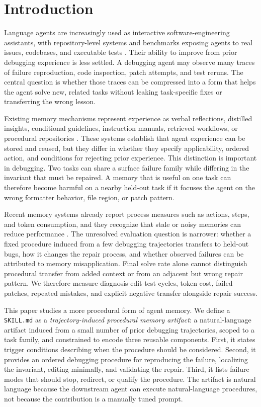 \section{Introduction}
\label{sec:introduction}

Language agents are increasingly used as interactive software-engineering assistants, with repository-level systems and benchmarks exposing agents to real issues, codebases, and executable tests \cite{jimenez2024swebench,yang2024sweagent}. Their ability to improve from prior debugging experience is less settled. A debugging agent may observe many traces of failure reproduction, code inspection, patch attempts, and test reruns. The central question is whether those traces can be compressed into a form that helps the agent solve new, related tasks without leaking task-specific fixes or transferring the wrong lesson.

Existing memory mechanisms represent experience as verbal reflections, distilled insights, conditional guidelines, instruction manuals, retrieved workflows, or procedural repositories \cite{shinn2023reflexion,zhao2024expel,fu2024autoguide,chen2024automanual,wang2025workflowmemory,fang2026memp}. These systems establish that agent experience can be stored and reused, but they differ in whether they specify applicability, ordered action, and conditions for rejecting prior experience. This distinction is important in debugging. Two tasks can share a surface failure family while differing in the invariant that must be repaired. A memory that is useful on one task can therefore become harmful on a nearby held-out task if it focuses the agent on the wrong formatter behavior, file region, or patch pattern.

Recent memory systems already report process measures such as actions, steps, and token consumption, and they recognize that stale or noisy memories can reduce performance \cite{fang2026memp,ouyang2026reasoningbank}. The unresolved evaluation question is narrower: whether a fixed procedure induced from a few debugging trajectories transfers to held-out bugs, how it changes the repair process, and whether observed failures can be attributed to memory misapplication. Final solve rate alone cannot distinguish procedural transfer from added context or from an adjacent but wrong repair pattern. We therefore measure diagnosis-edit-test cycles, token cost, failed patches, repeated mistakes, and explicit negative transfer alongside repair success.

This paper studies a more procedural form of agent memory. We define a \texttt{SKILL.md} as a \emph{trajectory-induced procedural memory artifact}: a natural-language artifact induced from a small number of prior debugging trajectories, scoped to a task family, and constrained to encode three reusable components. First, it states trigger conditions describing when the procedure should be considered. Second, it provides an ordered debugging procedure for reproducing the failure, localizing the invariant, editing minimally, and validating the repair. Third, it lists failure modes that should stop, redirect, or qualify the procedure. The artifact is natural language because the downstream agent can execute natural-language procedures, not because the contribution is a manually tuned prompt.

